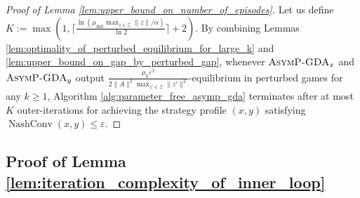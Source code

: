 \documentclass{article}
\DeclareMathOperator{\NashConv}{NashConv}
\newcommand{\Z}{\mathcal{Z}}
\theoremstyle{plain}
\begin{document}
\begin{proof}[Proof of Lemma \ref{lem:upper_bound_on_number_of_episodes}]
    Let us define $K:=\max\left(1, \lceil \frac{\ln (\mu_{\mathrm{init}}\max_{z\in \Z}\|z\|/\alpha)}{\ln 2}\rceil + 2\right)$.
    By combining Lemmas \ref{lem:optimality_of_perturbed_equilibrium_for_large_k} and \ref{lem:upper_bound_on_gap_by_perturbed_gap}, whenever $\textsc{AsymP-GDA}_x$ and $\textsc{AsymP-GDA}_y$ output $\frac{\mu_k \varepsilon^2}{2\|A\|^2 \max_{z'\in \Z}\|z'\|^2}$-equilibrium in perturbed games for any $k\geq 1$, Algorithm \ref{alg:parameter_free_asymp_gda} terminates after at most $K$ outer-iterations for achieving the strategy profile $(x, y)$ satisfying $\NashConv(x, y)\leq \varepsilon$.
\end{proof}


\subsection{Proof of Lemma \ref{lem:iteration_complexity_of_inner_loop}}
\end{document}
